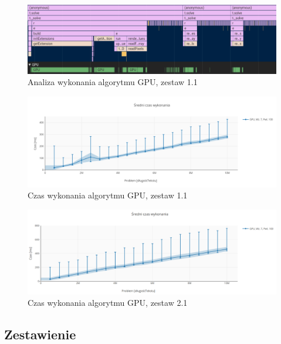 \begin{figure}
    \centering
    \includegraphics[keepaspectratio, width=1.0\linewidth]{benchmarks/nvidia970_chrome/gpu_profiler.png}
    \caption{Analiza wykonania algorytmu GPU, zestaw 1.1}
    \label{fig:profiler_gpu}
\end{figure}

\begin{figure}
    \centering
    \includegraphics[keepaspectratio, width=1.0\linewidth, trim=1.1cm 0.9cm 0.5cm 3.5cm, clip]{benchmarks/nvidia970_chrome/gpu_mean.png}
    \caption{Czas wykonania algorytmu GPU, zestaw 1.1}
    \label{fig:chart_gpu_mean_chrome_damian}
\end{figure}

\begin{figure}
    \centering
    \includegraphics[keepaspectratio, width=1.0\linewidth, trim=0 0 0 2.7cm, clip]{benchmarks/intel_hd520_chrome/gpu_mean.png}
    \caption{Czas wykonania algorytmu GPU, zestaw 2.1}
    \label{fig:chart_gpu_mean_chrome_maja}
\end{figure}

\subsection{Zestawienie}

